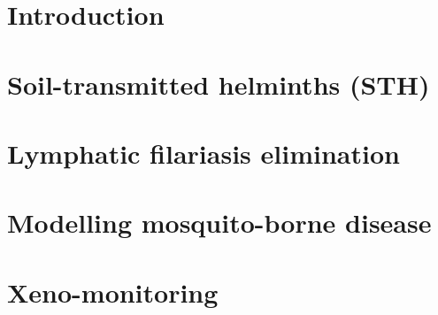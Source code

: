 \documentclass[11pt,a4paper]{report}      %
\begin{document}



\chapter{Introduction}
%



\chapter{Soil-transmitted helminths (STH)}
\label{chap:STH}



\chapter{Lymphatic filariasis elimination}
\label{chap:ELIM}




\chapter{Modelling mosquito-borne disease}
\label{chap:VEC}



\chapter{Xeno-monitoring}
\label{chap:XENO}
\end{document}
